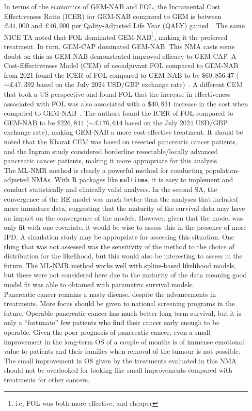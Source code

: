 In terms of the economics of GEM-NAB and FOL, the Incramental Cost Effectiveness Ratio (ICER) for GEM-NAB compared to GEM is between $£41,000$ and $£46,000$ per Qality-Adjusted Life Year (QALY) gained~\cite{TA476}. The same NICE TA noted that FOL dominated GEM-NAB\footnote{i.e, FOL was both more effective, and cheaper}, making it the preferred treatment. In turn, GEM-CAP dominated GEM-NAB. This NMA casts some doubt on this as GEM-NAB demonstrated improved efficacy to GEM-CAP. A Cost-Effectiveness Model (CEM) of neoadjuvant FOL compared to GEM-NAB from 2021 found the ICER of FOL compared to GEM-NAB to be $\$60,856.47$ ($\sim £47,392$ based on the July 2024 USD/GBP exchange rate)~\cite{ingram}. A different CEM that took a US perspective and found FOL that the increase in effectiveness associated with FOL was also associated with a $\$40,831$ increase in the cost when compated to GEM-NAB~\cite{kharat}. The authors found the ICER of FOL compared to GEM-NAB to be $\$226,841$ ($\sim £176,614$ based on the July 2024 USD/GBP exchange rate), making GEM-NAB a more cost-effective treatment. It should be noted that the Kharat CEM was based on resected pancreatic cancer patients, and the Ingram study considered borderline resectable/locally advanced pancreatic cancer patients, making it more appropriate for this analysis. \\

The ML-NMR method is clearly a powerful method for conducting population-adjusted NMAs. With R packages like \verb|multinma|, it is easy to implement and conduct statistically and clinically valid analyses. In the second SA, the convergence of the RE model was much better than the analyses that included more immature data, suggesting that the maturity of the survival data may have an impact on the convergence of the models. However, given that the model was only fit with one covariate, it would be wise to assess this in the presence of more IPD. A simulation study may be appropriate for assessing this situation. One thing that was not assessed was the sensitivity of the method to the choice of distribution for the likelihood, but this would also be interesting to assess in the future. The ML-NMR method works well with spline-based likelihood models, but these were not considered here due to the maturity of the data meaning good model fit was able to obtained with parametric survival models.\\

Pancreatic cancer remains a nasty disease, despite the advancements in treatments. More focus should be given to national screening programs in the future. Operable pancreatic cancer has much better long term survival, but it is only a ``fortunate'' few patients who find their cancer early enough to be operable. Given the poor prognosis of pancreatic cancer, even a small improvement in the long-term OS of a couple of months is of immense emotional value to patients and their families when removal of the tumour is not possible. The small improvement in OS given by the treatments evaluated in this NMA should not be overlooked for looking like small improvements compared with treatments for other cancers.

